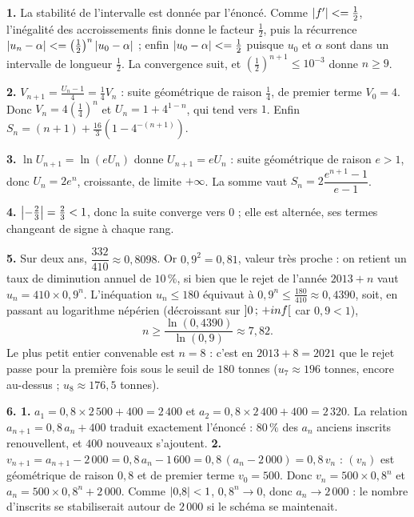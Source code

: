 \begin{corrige}[annales]
\textbf{1.} La stabilité de l'intervalle est donnée par l'énoncé. Comme
$\left|f'\right| <= \frac12$, l'inégalité des accroissements finis donne le
facteur $\frac12$, puis la récurrence
$\left|u_{n}-\alpha\right| <= \left(\frac12\right)^{n}\left|u_{0}-\alpha\right|$ ; enfin
$\left|u_{0}-\alpha\right| <= \frac12$ puisque $u_{0}$ et $\alpha$ sont dans un
intervalle de longueur $\frac12$. La convergence suit, et
$\left(\frac12\right)^{n+1} \leq 10^{-3}$ donne $n \geq 9$.

\textbf{2.} $V_{n+1} = \frac{U_{n}-1}{4} = \frac14V_{n}$ : suite géométrique
de raison $\frac14$, de premier terme $V_{0} = 4$. Donc
$V_{n} = 4\left(\frac14\right)^{n}$ et $U_{n} = 1+4^{1-n}$, qui tend vers
$1$. Enfin
$S_{n} = (n+1)+\frac{16}{3}\left(1-4^{-(n+1)}\right)$.

\textbf{3.} $\ln U_{n+1} = \ln(eU_{n})$ donne $U_{n+1} = eU_{n}$ : suite
géométrique de raison $e>1$, donc $U_{n} = 2e^{n}$, croissante, de limite
$+\infty$. La somme vaut $S_{n} = 2\dfrac{e^{n+1}-1}{e-1}$.

\textbf{4.} $\left|-\frac23\right| = \frac23<1$, donc la suite converge vers $0$ ;
elle est alternée, ses termes changeant de signe à chaque rang.

\textbf{5.} Sur deux ans, $\dfrac{332}{410} \approx 0{,}8098$. Or
$0{,}9^{2} = 0{,}81$, valeur très proche : on retient un taux de diminution
annuel de $10\,\%$, si bien que le rejet de l'année $2013+n$ vaut
$u_{n} = 410 \times 0{,}9^{n}$. L'inéquation $u_{n} \leq 180$ équivaut à
$0{,}9^{n} \leq \frac{180}{410} \approx 0{,}4390$, soit, en passant au
logarithme népérien (décroissant sur $\left]0\,;\,+inf\right[$ car
$0{,}9<1$),
\[
  n \geq \frac{\ln(0{,}4390)}{\ln(0{,}9)} \approx 7{,}82 .
\]
Le plus petit entier convenable est $n = 8$ : c'est en $2013+8 = 2021$ que le
rejet passe pour la première fois sous le seuil de $180$ tonnes
($u_{7}\approx196$ tonnes, encore au-dessus ; $u_{8}\approx176{,}5$ tonnes).

\textbf{6. 1.} $a_{1} = 0{,}8\times2\,500+400 = 2\,400$ et
$a_{2} = 0{,}8\times2\,400+400 = 2\,320$. La relation
$a_{n+1} = 0{,}8\,a_{n}+400$ traduit exactement l'énoncé : $80\,\%$ des
$a_{n}$ anciens inscrits renouvellent, et $400$ nouveaux s'ajoutent.
\textbf{2.} $v_{n+1} = a_{n+1}-2\,000 = 0{,}8\,a_{n}-1\,600
= 0{,}8\,(a_{n}-2\,000) = 0{,}8\,v_{n}$ : $(v_{n})$ est géométrique de raison
$0{,}8$ et de premier terme $v_{0} = 500$. Donc
$v_{n} = 500\times0{,}8^{n}$ et $a_{n} = 500\times0{,}8^{n}+2\,000$. Comme
$\left|0{,}8\right|<1$, $0{,}8^{n}\to0$, donc $a_{n}\to2\,000$ : le nombre
d'inscrits se stabiliserait autour de $2\,000$ si le schéma se maintenait.
\end{corrige}

